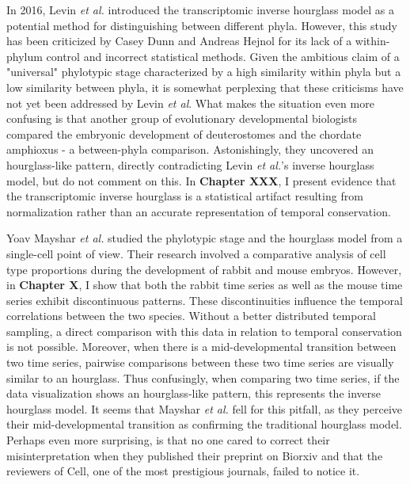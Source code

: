 In 2016, Levin \textit{et al.} introduced the transcriptomic inverse hourglass model as a potential method for distinguishing between different phyla\cite{Levin2016}. However, this study has been criticized by Casey Dunn and Andreas Hejnol for its lack of a within-phylum control\cite{hejnol2016} and incorrect statistical methods\cite{Dunn2018}. Given the ambitious claim of a "universal" phylotypic stage characterized by a high similarity within phyla but a low similarity between phyla, it is somewhat perplexing that these criticisms have not yet been addressed by Levin \textit{et al}. What makes the situation even more confusing is that another group of evolutionary developmental biologists compared the embryonic development of deuterostomes and the chordate amphioxus - a between-phyla comparison. Astonishingly, they uncovered an hourglass-like pattern\cite{PerezPosada2022}, directly contradicting Levin \textit{et al.}'s inverse hourglass model, but do not comment on this. In \textbf{Chapter XXX}, I present evidence that the transcriptomic inverse hourglass is a statistical artifact resulting from normalization rather than an accurate representation of temporal conservation. 

Yoav Mayshar \textit{et al.} studied the phylotypic stage and the hourglass model from a single-cell point of view\cite{Mayshar2023}. Their research involved a comparative analysis of cell type proportions during the development of rabbit and mouse embryos. However, in \textbf{Chapter X}, I show that both the rabbit time series as well as the mouse time series exhibit discontinuous patterns. These discontinuities influence the temporal correlations between the two species. Without a better distributed temporal sampling, a direct comparison with this data in relation to temporal conservation is not possible. Moreover, when there is a mid-developmental transition between two time series, pairwise comparisons between these two time series are visually similar to an hourglass. Thus confusingly, when comparing two time series, if the data visualization shows an hourglass-like pattern, this represents the inverse hourglass model. It seems that Mayshar \textit{et al.} fell for this pitfall, as they perceive their mid-developmental transition as confirming the traditional hourglass model. Perhaps even more surprising, is that no one cared to correct their misinterpretation when they published their preprint on Biorxiv and that the reviewers of Cell, one of the most prestigious journals, failed to notice it.


